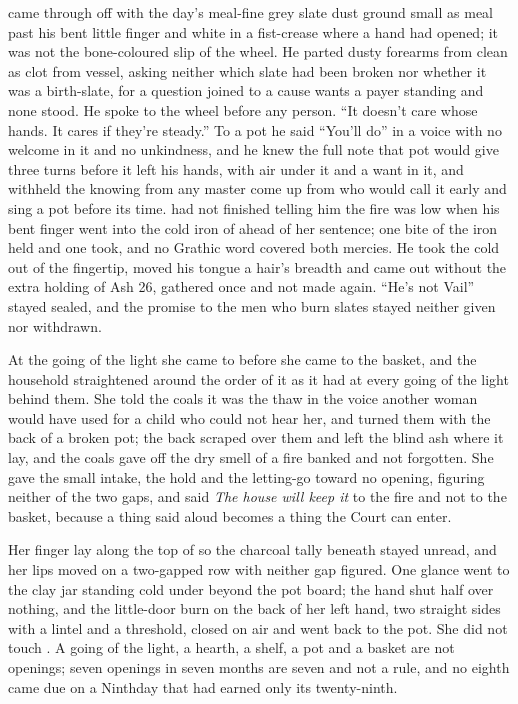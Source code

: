  came through  off  with the day's meal-fine grey slate dust ground small as meal past his bent little finger and white in a fist-crease where a hand had opened; it was not the bone-coloured slip of the wheel. He parted dusty forearms from clean as clot from vessel, asking neither which slate had been broken nor whether it was a birth-slate, for a question joined to a cause wants a payer standing and none stood. He spoke to the wheel before any person. “It doesn't care whose hands. It cares if they're steady.” To a pot he said “You'll do” in a voice with no welcome in it and no unkindness, and he knew the full note that pot would give three turns before it left his hands, with air under it and a want in it, and withheld the knowing from any master come up from  who would call it early and sing a pot before its time.  had not finished telling him the fire was low when his bent finger went into the cold iron of  ahead of her sentence; one bite of the iron held and one took, and no Grathic word covered both mercies. He took the cold out of the fingertip, moved his tongue a hair's breadth and came out without the extra holding of Ash 26, gathered once and not made again. “He's not Vail” stayed sealed, and the promise to the men who burn slates stayed neither given nor withdrawn.

\scenebreak

At the going of the light she came to  before she came to the basket, and the household straightened around the order of it as it had at every going of the light behind them. She told the coals it was the thaw in the voice another woman would have used for a child who could not hear her, and turned them with the back of a broken pot; the back scraped over them and left the blind ash where it lay, and the coals gave off the dry smell of a fire banked and not forgotten. She gave the small intake, the hold and the letting-go toward no opening, figuring neither of the two gaps, and said \emph{The house will keep it} to the fire and not to the basket, because a thing said aloud becomes a thing the Court can enter.

Her finger lay along the top of  so the charcoal tally beneath stayed unread, and her lips moved on a two-gapped row with neither gap figured. One glance went to the clay jar standing cold under  beyond the pot board; the hand shut half over nothing, and the little-door burn on the back of her left hand, two straight sides with a lintel and a threshold, closed on air and went back to the pot. She did not touch . A going of the light, a hearth, a shelf, a pot and a basket are not openings; seven openings in seven months are seven and not a rule, and no eighth came due on a Ninthday that had earned only its twenty-ninth.

